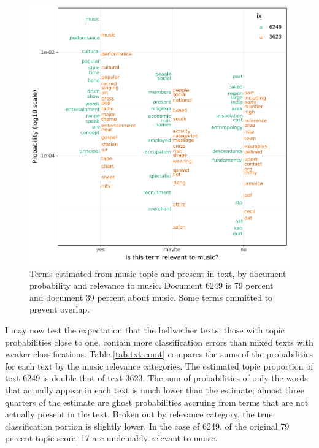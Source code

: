 \documentclass[]{book}
\theoremstyle{definition}
\theoremstyle{definition}
\theoremstyle{definition}
\theoremstyle{remark}
\begin{document}
\begin{figure}

{\centering \includegraphics[width=0.9\linewidth]{03_files/figure-latex/txt-com-1} 

}

\caption{Terms estimated from music topic and present in text, by document probability and relevance to music. Document 6249 is 79 percent and document 39 percent about music. Some terms ommitted to prevent overlap.}\label{fig:txt-com}
\end{figure}

I may now test the expectation that the bellwether texts, those with
topic probabilities close to one, contain more classification errors
than mixed texts with weaker classifications. Table \ref{tab:txt-comt}
compares the sums of the probabilities for each text by the music
relevance categories. The estimated topic proportion of text 6249 is
double that of text 3623. The sum of probabilities of only the words
that actually appear in each text is much lower than the estimate;
almost three quarters of the estimate are ghost probabilities accruing
from terms that are not actually present in the text. Broken out by
relevance category, the true classification portion is slightly lower.
In the case of 6249, of the original 79 percent topic score, 17 are
undeniably relevant to music.
\end{document}
